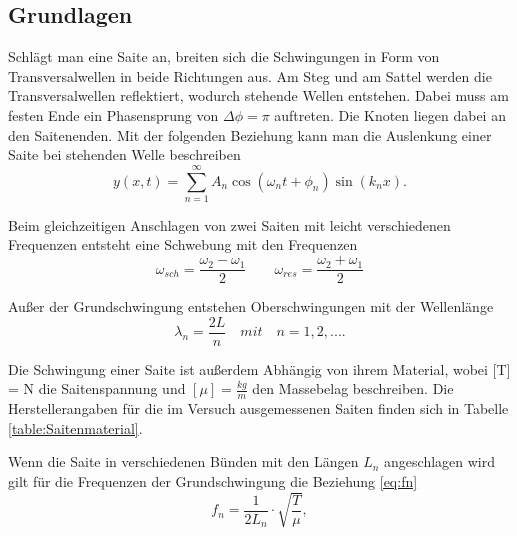\documentclass[a4paper, 11pt]{article}
\begin{document}
\subsection{Grundlagen}
Schlägt man eine Saite an, breiten sich die Schwingungen in Form von Transversalwellen in beide Richtungen aus. Am Steg und am Sattel werden die Transversalwellen reflektiert, wodurch stehende Wellen entstehen. Dabei muss am festen Ende ein Phasensprung von $\Delta \phi = \pi$ auftreten. Die Knoten liegen dabei an den Saitenenden. Mit der folgenden Beziehung kann man die Auslenkung einer Saite bei stehenden Welle beschreiben
\begin{equation}
y(x,t) = \sum_{n=1}^{\infty} A_n\cos(\omega_nt+\phi_n)\sin(k_nx).
\end{equation}

Beim gleichzeitigen Anschlagen von zwei Saiten mit leicht verschiedenen Frequenzen entsteht eine Schwebung mit den Frequenzen
\begin{equation}
\omega_{sch} = \frac{\omega_2 - \omega_1}{2} \qquad \omega_{res} = \frac{\omega_2 + \omega_1}{2}
\end{equation}

Außer der Grundschwingung entstehen Oberschwingungen mit der Wellenlänge
\begin{equation}
\lambda_n = \frac{2L}{n} \quad mit \quad  n = 1,2,... .
\end{equation}

Die Schwingung einer Saite ist außerdem Abhängig von ihrem Material, wobei [T] = N die Saitenspannung und $[\mu] = \frac{kg}{m}$ den Massebelag beschreiben. Die Herstellerangaben für die im Versuch ausgemessenen Saiten finden sich in Tabelle \ref{table:Saitenmaterial}.

Wenn die Saite in verschiedenen Bünden mit den Längen $L_n$ angeschlagen wird gilt für die Frequenzen der Grundschwingung die Beziehung \ref{eq:fn}
\begin{equation}\label{eq:fn}
f_n = \frac{1}{2 L_n} \cdot \sqrt{\frac{T}{\mu}},
\end{equation} 
\end{document}
